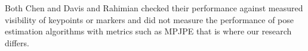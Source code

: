 
Both Chen and Davis and Rahimian checked their performance against measured visibility of keypoints or markers and did not measure the performance of pose estimation algorithms with metrics such as MPJPE that is where our research differs.

